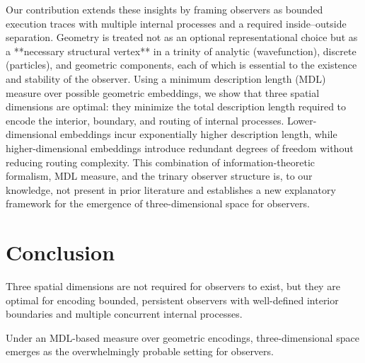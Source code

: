 \documentclass[11pt]{article}
\begin{document}
Our contribution extends these insights by framing observers as bounded execution traces with multiple internal processes and a required inside–outside separation. Geometry is treated not as an optional representational choice but as a **necessary structural vertex** in a trinity of analytic (wavefunction), discrete (particles), and geometric components, each of which is essential to the existence and stability of the observer. Using a minimum description length (MDL) measure over possible geometric embeddings, we show that three spatial dimensions are optimal: they minimize the total description length required to encode the interior, boundary, and routing of internal processes. Lower-dimensional embeddings incur exponentially higher description length, while higher-dimensional embeddings introduce redundant degrees of freedom without reducing routing complexity. This combination of information-theoretic formalism, MDL measure, and the trinary observer structure is, to our knowledge, not present in prior literature and establishes a new explanatory framework for the emergence of three-dimensional space for observers.




\section{Conclusion}

Three spatial dimensions are not required for observers to exist, but they are optimal for encoding bounded, persistent observers with well-defined interior boundaries and multiple concurrent internal processes.

Under an MDL-based measure over geometric encodings, three-dimensional space emerges as the overwhelmingly probable setting for observers.
\end{document}
